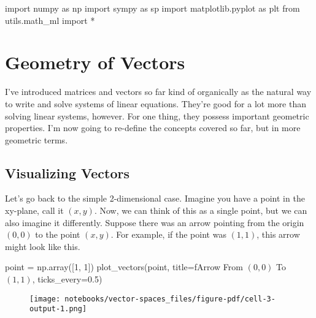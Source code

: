\documentclass[
  letterpaper,
  DIV=11,
  numbers=noendperiod]{scrreprt}
\newenvironment{Shaded}{\begin{snugshade}}{\end{snugshade}}
\newcommand{\DecValTok}[1]{\textcolor[rgb]{0.68,0.00,0.00}{#1}}
\newcommand{\FloatTok}[1]{\textcolor[rgb]{0.68,0.00,0.00}{#1}}
\newcommand{\ImportTok}[1]{\textcolor[rgb]{0.00,0.46,0.62}{#1}}
\newcommand{\NormalTok}[1]{\textcolor[rgb]{0.00,0.23,0.31}{#1}}
\newcommand{\OperatorTok}[1]{\textcolor[rgb]{0.37,0.37,0.37}{#1}}
\newcommand{\SpecialStringTok}[1]{\textcolor[rgb]{0.13,0.47,0.30}{#1}}
\begin{document}
\begin{Shaded}
\begin{Highlighting}[]
\ImportTok{import}\NormalTok{ numpy }\ImportTok{as}\NormalTok{ np}
\ImportTok{import}\NormalTok{ sympy }\ImportTok{as}\NormalTok{ sp}
\ImportTok{import}\NormalTok{ matplotlib.pyplot }\ImportTok{as}\NormalTok{ plt}
\ImportTok{from}\NormalTok{ utils.math\_ml }\ImportTok{import} \OperatorTok{*}
\end{Highlighting}
\end{Shaded}

\hypertarget{geometry-of-vectors}{%
\section{Geometry of Vectors}\label{geometry-of-vectors}}

I've introduced matrices and vectors so far kind of organically as the
natural way to write and solve systems of linear equations. They're good
for a lot more than solving linear systems, however. For one thing, they
possess important geometric properties. I'm now going to re-define the
concepts covered so far, but in more geometric terms.

\hypertarget{visualizing-vectors}{%
\subsection{Visualizing Vectors}\label{visualizing-vectors}}

Let's go back to the simple 2-dimensional case. Imagine you have a point
in the xy-plane, call it \((x,y)\). Now, we can think of this as a
single point, but we can also imagine it differently. Suppose there was
an arrow pointing from the origin \((0,0)\) to the point \((x,y)\). For
example, if the point was \((1,1)\), this arrow might look like this.

\begin{Shaded}
\begin{Highlighting}[]
\NormalTok{point }\OperatorTok{=}\NormalTok{ np.array([}\DecValTok{1}\NormalTok{, }\DecValTok{1}\NormalTok{])}
\NormalTok{plot\_vectors(point, title}\OperatorTok{=}\SpecialStringTok{f\textquotesingle{}Arrow From $(0,0)$ To $(1,1)$\textquotesingle{}}\NormalTok{, ticks\_every}\OperatorTok{=}\FloatTok{0.5}\NormalTok{)}
\end{Highlighting}
\end{Shaded}

\begin{figure}[H]

{\centering \texttt{[image: notebooks/vector-spaces\_files/figure-pdf/cell-3-output-1.png]}

}

\end{figure}
\end{document}
